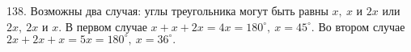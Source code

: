 138. Возможны два случая: углы треугольника могут быть равны $x,\ x$ и $2x$ или $2x,\ 2x$ и $x.$ В первом случае $x+x+2x=4x=180^\circ,\ x=45^\circ.$ Во втором случае $2x+2x+x=5x=180^\circ,\ x=36^\circ.$\newpage\noindent
